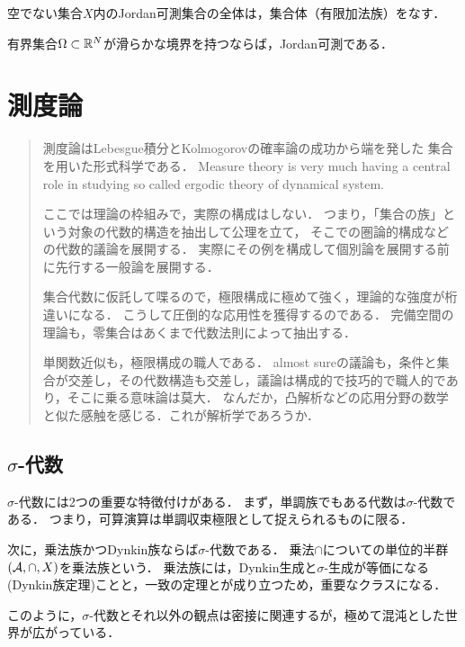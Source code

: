 \documentclass[uplatex, dvipdfmx]{jsreport}
\begin{document}
\begin{proposition}[有限加法族である]
    空でない集合$X$内のJordan可測集合の全体は，集合体（有限加法族）をなす．
\end{proposition}

\begin{theorem}
    有界集合$\Omega\subset\mathbb{R}^N$が滑らかな境界を持つならば，Jordan可測である．
\end{theorem}

\chapter{測度論}

\begin{quotation}
    測度論はLebesgue積分とKolmogorovの確率論の成功から端を発した
    集合を用いた形式科学である．
    Measure theory is very much having a central role in studying so called ergodic theory of dynamical system.

    ここでは理論の枠組みで，実際の構成はしない．
    つまり，「集合の族」という対象の代数的構造を抽出して公理を立て，
    そこでの圏論的構成などの代数的議論を展開する．
    実際にその例を構成して個別論を展開する前に先行する一般論を展開する．

    集合代数に仮託して喋るので，極限構成に極めて強く，理論的な強度が桁違いになる．
    こうして圧倒的な応用性を獲得するのである．
    完備空間の理論も，零集合はあくまで代数法則によって抽出する．

    単関数近似も，極限構成の職人である．
    almost sureの議論も，条件と集合が交差し，その代数構造も交差し，議論は構成的で技巧的で職人的であり，そこに乗る意味論は莫大．
    なんだか，凸解析などの応用分野の数学と似た感触を感じる．これが解析学であろうか．
\end{quotation}

\section{$\sigma$-代数}

\begin{tcolorbox}[colframe=ForestGreen, colback=ForestGreen!10!white,breakable,colbacktitle=ForestGreen!40!white,coltitle=black,fonttitle=\bfseries\sffamily,
title=集合代数の構造のうち，真に注目すべき代数的構造が$\sigma$-代数]
    $\sigma$-代数には2つの重要な特徴付けがある．
    まず，単調族でもある代数は$\sigma$-代数である．
    つまり，可算演算は単調収束極限として捉えられるものに限る．

    次に，乗法族かつDynkin族ならば$\sigma$-代数である．
    乗法$\cap$についての単位的半群
    $(\mathcal{A},\cap,X)$を乗法族という．
    乗法族には，Dynkin生成と$\sigma$-生成が等価になる(Dynkin族定理)ことと，一致の定理とが成り立つため，重要なクラスになる．

    このように，$\sigma$-代数とそれ以外の観点は密接に関連するが，極めて混沌とした世界が広がっている．
\end{tcolorbox}
\end{document}
